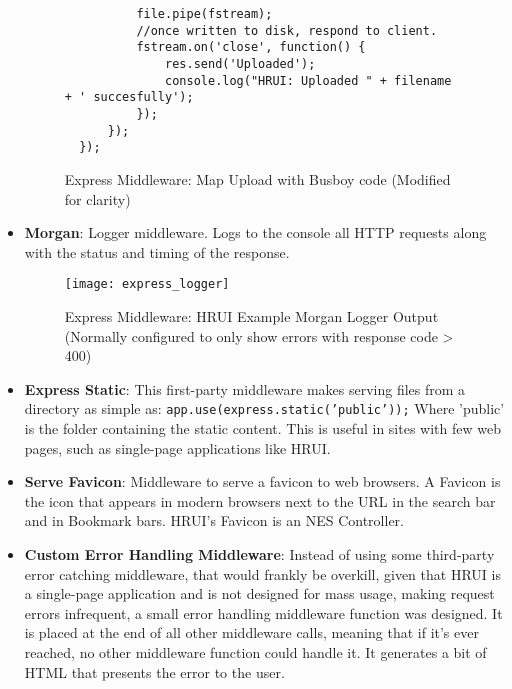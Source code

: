 \begin{itemize}
\begin{figure}[H]
\begin{verbatim}
          file.pipe(fstream);
          //once written to disk, respond to client.
          fstream.on('close', function() {
              res.send('Uploaded');
              console.log("HRUI: Uploaded " + filename + ' succesfully');
          });
      });
  });
  \end{verbatim}
  \caption{Express Middleware: Map Upload with Busboy code (Modified for clarity)}
  \end{figure}
  \item \textbf{Morgan}: Logger middleware. Logs to the console all HTTP requests along with the status and timing of the response.
  \begin{figure}[H]
  \captionsetup{justification=centering}
  \begin{center}
    \texttt{[image: express\_logger]}
  \end{center}
  \caption{Express Middleware: HRUI Example Morgan Logger Output\\(Normally configured to only show errors with response code > 400)}
  \end{figure}
  \item \textbf{Express Static}: This first-party middleware makes serving files from a directory as simple as: \texttt{app.use(express.static('public'));} Where 'public' is the folder containing the static content. This is useful in sites with few web
  pages, such as single-page applications like HRUI.
  \item \textbf{Serve Favicon}: Middleware to serve a favicon to web browsers. A Favicon is the icon that appears in modern browsers
  next to the URL in the search bar and in Bookmark bars. HRUI's Favicon is an NES Controller.
  \item \textbf{Custom Error Handling Middleware}: Instead of using some third-party error catching middleware, that would frankly be
  overkill, given that HRUI is a single-page application and is not designed for mass usage, making request errors infrequent, a small
  error handling middleware function was designed. It is placed at the end of all other middleware calls, meaning that if it's ever
  reached, no other middleware function could handle it. It generates a bit of HTML that presents the error to the user.
  \begin{figure}[H]
  \centering
  \captionsetup{justification=centering}
  \begin{verbatim}

\end{verbatim}
\end{figure}
\end{itemize}
